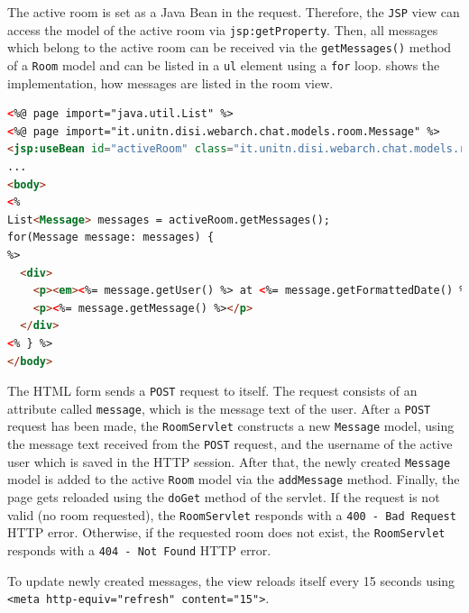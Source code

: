 The active room is set as a Java Bean in the request. Therefore, the \texttt{JSP} view can access the model of the active room via \texttt{jsp:getProperty}. Then, all messages which belong to the active room can be received via the \texttt{getMessages()} method of a \texttt{Room} model and can be listed in a \texttt{ul} element using a \texttt{for} loop.  shows the implementation, how messages are listed in the room view.
\begin{lstlisting}[label=lst:03_impl_servlets_room_bean, caption=List messages for a specific room, language=html]
<%@ page import="java.util.List" %>
<%@ page import="it.unitn.disi.webarch.chat.models.room.Message" %>
<jsp:useBean id="activeRoom" class="it.unitn.disi.webarch.chat.models.room.Room" scope="request" />
...
<body>
<%
List<Message> messages = activeRoom.getMessages();
for(Message message: messages) {
%>
  <div>
    <p><em><%= message.getUser() %> at <%= message.getFormattedDate() %>:</em></p>
    <p><%= message.getMessage() %></p>
  </div>
<% } %>
</body>
\end{lstlisting}

The HTML form sends a \texttt{POST} request to itself. The request consists of an attribute called \texttt{message}, which is the message text of the user. After a \texttt{POST} request has been made, the \texttt{RoomServlet} constructs a new \texttt{Message} model, using the message text received from the \texttt{POST} request, and the username of the active user which is saved in the HTTP session. After that, the newly created \texttt{Message} model is added to the active \texttt{Room} model via the \texttt{addMessage} method. Finally, the page gets reloaded using the \texttt{doGet} method of the servlet. If the request is not valid (no room requested), the \texttt{RoomServlet} responds with a \texttt{400 - Bad Request} HTTP error. Otherwise, if the requested room does not exist, the \texttt{RoomServlet} responds with a \texttt{404 - Not Found} HTTP error.

To update newly created messages, the view reloads itself every 15 seconds using \texttt{<meta http-equiv="refresh" content="15">}.


\newpage
